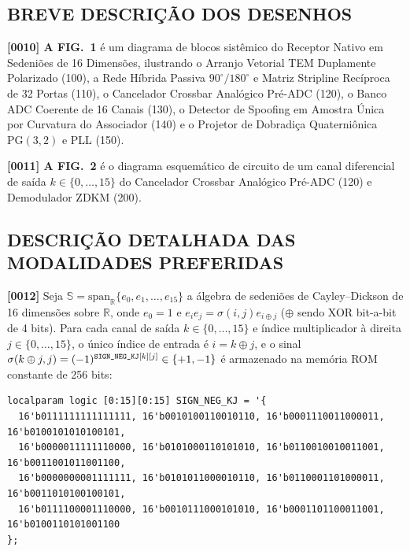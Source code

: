 \documentclass[12pt,a4paper]{article}
\begin{document}
\subsection*{BREVE DESCRI\c{C}\~AO DOS DESENHOS}
\textbf{[0010] A FIG.\ 1} \'e um diagrama de blocos sist\^emico do Receptor Nativo em Sedeni\~oes de 16 Dimens\~oes, ilustrando o Arranjo Vetorial TEM Duplamente Polarizado (100), a Rede H\'ibrida Passiva $90^\circ/180^\circ$ e Matriz Stripline Rec\'iproca de 32 Portas (110), o Cancelador Crossbar Anal\'ogico Pr\'e-ADC (120), o Banco ADC Coerente de 16 Canais (130), o Detector de Spoofing em Amostra \'Unica por Curvatura do Associador (140) e o Projetor de Dobradi\c{c}a Quaterni\^onica $\mathrm{PG}(3,2)$ e PLL (150).

\textbf{[0011] A FIG.\ 2} \'e o diagrama esquem\'atico de circuito de um canal diferencial de sa\'ida $k \in \{0,\dots,15\}$ do Cancelador Crossbar Anal\'ogico Pr\'e-ADC (120) e Demodulador ZDKM (200).

\subsection*{DESCRI\c{C}\~AO DETALHADA DAS MODALIDADES PREFERIDAS}
\textbf{[0012]} Seja $\mathbb{S} = \mathrm{span}_{\mathbb{R}}\{e_0, e_1, \dots, e_{15}\}$ a \'algebra de sedeni\~oes de Cayley--Dickson de 16 dimens\~oes sobre $\mathbb{R}$, onde $e_0 = 1$ e $e_i e_j = \sigma(i, j) e_{i \oplus j}$ ($\oplus$ sendo XOR bit-a-bit de 4 bits). Para cada canal de sa\'ida $k \in \{0,\dots,15\}$ e \'indice multiplicador \`a direita $j \in \{0,\dots,15\}$, o \'unico \'indice de entrada \'e $i = k \oplus j$, e o sinal $\sigma(k \oplus j, j) = (-1)^{\text{\texttt{SIGN\_NEG\_KJ}}[k][j]} \in \{+1, -1\}$ \'e armazenado na mem\'oria ROM constante de 256 bits:
{\footnotesize
\begin{verbatim}
localparam logic [0:15][0:15] SIGN_NEG_KJ = '{
  16'b0111111111111111, 16'b0010100110010110, 16'b0001110011000011, 16'b0100101010100101,
  16'b0000011111110000, 16'b0101000110101010, 16'b0110010010011001, 16'b0011001011001100,
  16'b0000000001111111, 16'b0101011000010110, 16'b0110001101000011, 16'b0011010100100101,
  16'b0111100001110000, 16'b0010111000101010, 16'b0001101100011001, 16'b0100110101001100
};
\end{verbatim}
}
\end{document}
